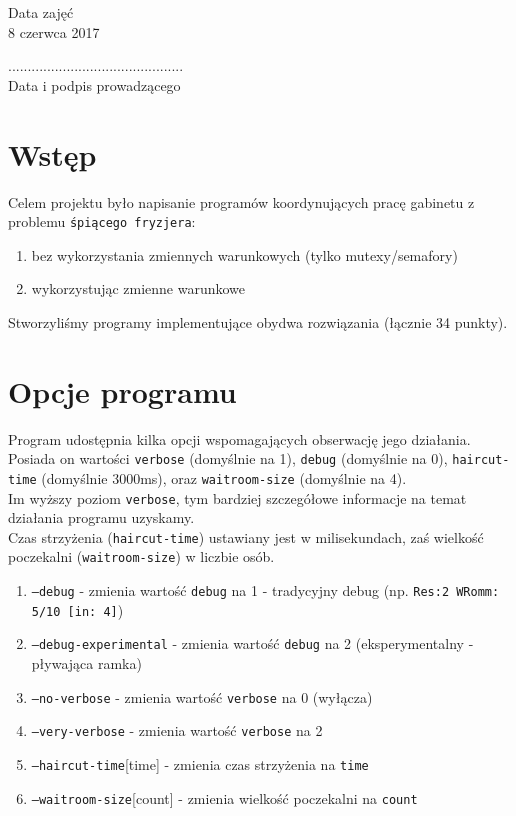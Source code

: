 \documentclass[12pt,a4paper]{article}
\newcommand{\datazajec}{8 czerwca 2017}
\begin{document}
	\begin{minipage}[t]{0.4\linewidth}
		\centering
		Data zajęć \\
		\small \datazajec
	\end{minipage}
	
	\begin{flushright}
		\begin{minipage}[t]{0.5\linewidth}
			\centering
			............................................. \\
			\small \textsf{Data i podpis prowadzącego}
		\end{minipage}
	\end{flushright}
	\pagebreak
	
	\section{Wstęp}
	Celem projektu było napisanie programów koordynujących pracę
	gabinetu z problemu \texttt{śpiącego fryzjera}:
	\begin{enumerate}[label=\alph*)]
		\item bez wykorzystania zmiennych warunkowych (tylko 
			mutexy/semafory)
		\item wykorzystując zmienne warunkowe
	\end{enumerate}
	
	Stworzyliśmy programy implementujące obydwa rozwiązania (łącznie
	34 punkty).
	
	\section{Opcje programu}
	Program udostępnia kilka opcji wspomagających obserwację jego
	działania. Posiada on wartości \texttt{verbose} (domyślnie na 1), 
	\texttt{debug} (domyślnie na 0), \texttt{haircut-time} (domyślnie
	3000ms), oraz \texttt{waitroom-size} (domyślnie na 4). \\
	Im wyższy poziom \texttt{verbose}, tym bardziej szczegółowe 
	informacje na temat działania programu uzyskamy. \\
	Czas strzyżenia (\texttt{haircut-time}) ustawiany jest w 
	milisekundach, zaś wielkość poczekalni (\texttt{waitroom-size}) w
	liczbie osób.
	\begin{enumerate}
		\item \texttt{--debug} - zmienia wartość \texttt{debug} na 1 - 
			tradycyjny debug (np. \texttt{Res:2 WRomm: 5/10 [in: 4]})
		\item \texttt{--debug-experimental} - zmienia wartość
			\texttt{debug} na 2 (eksperymentalny - pływająca ramka)
		\item \texttt{--no-verbose} - zmienia wartość \texttt{verbose}
			na 0 (wyłącza)
		\item \texttt{--very-verbose} - zmienia wartość \texttt{verbose}
			na 2
		\item \texttt{--haircut-time}[time] - zmienia czas strzyżenia na
			\texttt{time}
		\item \texttt{--waitroom-size}[count] - zmienia wielkość
			poczekalni na \texttt{count}
	\end{enumerate}
	
\end{document}
